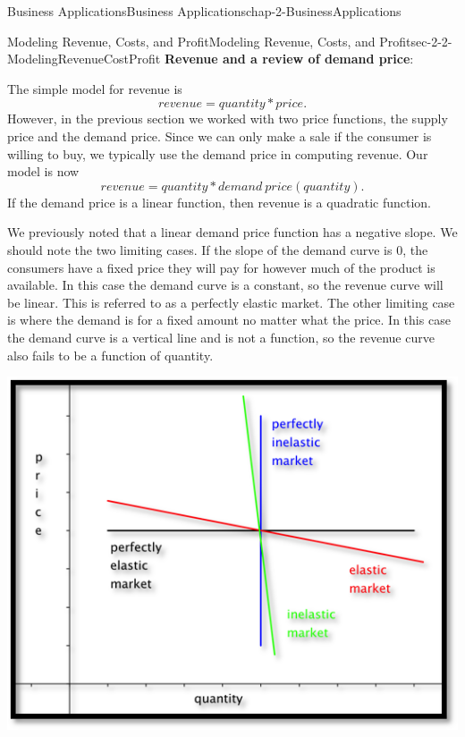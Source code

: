 \documentclass[oneside,10pt,]{book}
\newcommand{\terminology}[1]{\textbf{#1}}
\numberwithin{equation}{section}
\begin{document}
\begin{chapterptx}{Business Applications}{}{Business Applications}{}{}{chap-2-BusinessApplications}
\begin{sectionptx}{Modeling Revenue, Costs, and Profit}{}{Modeling Revenue, Costs, and Profit}{}{}{sec-2-2-ModelingRevenueCostProfit}
\terminology{Revenue and a review of demand price}:%
\par
\hypertarget{p-635}{}%
The simple model for revenue is%
%
\begin{equation*}
revenue=quantity*price.
\end{equation*}
\hypertarget{p-636}{}%
However, in the previous section we worked with two price functions, the supply price and the demand price.  Since we can only make a sale if the consumer is willing to buy, we typically use the demand price in computing revenue.  Our model is now%
%
\begin{equation*}
revenue=quantity*demand\ price(quantity).
\end{equation*}
\hypertarget{p-637}{}%
If the demand price is a linear function, then revenue is a quadratic function.%
\par
\hypertarget{p-638}{}%
We previously noted that a linear demand price function has a negative slope. We should note the two limiting cases. If the slope of the demand curve is 0, the consumers have a fixed price they will pay for however much of the product is available.  In this case the demand curve is a constant, so the revenue curve will be linear.  This is referred to as a perfectly elastic market.  The other limiting case is where the demand is for a fixed amount no matter what the price.  In this case the demand curve is a vertical line and is not a function, so the revenue curve also fails to be a function of quantity.%
\begin{sidebyside}{1}{0.2}{0.2}{0}%
\begin{sbspanel}{0.6}%
\includegraphics[width=1\linewidth]{images/sec2-2-1.png}

\end{sbspanel}
\end{sidebyside}
\end{sectionptx}
\end{chapterptx}
\end{document}
